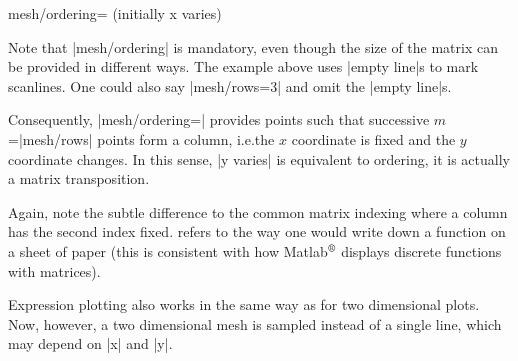 {\begin{pgfplotskey}{mesh/ordering= (initially x varies)}
\begin{codeexample}[]
\end{codeexample}
    \noindent Note that |mesh/ordering| is mandatory, even though the size of
    the matrix can be provided in different ways. The example above uses
    |empty line|s to mark scanlines. One could also say |mesh/rows=3| and omit
    the |empty line|s.

    Consequently, |mesh/ordering=| provides points such
    that successive $m$=|mesh/rows| points form a column, i.e.\@ the $x$
    coordinate is fixed and the $y$ coordinate changes. In this sense,
    |y varies| is equivalent to  ordering, it is actually
    a matrix transposition.
\begin{codeexample}[]
\end{codeexample}
    Again, note the subtle difference to the common matrix indexing where a
    column has the second index fixed. \PGFPlots{} refers to the way one would
    write down a function on a sheet of paper (this is consistent with how
    Matlab$^\text{\textregistered}$ displays discrete functions with matrices).
\end{pgfplotskey}

\begin{addplot3operation}[]{}{}
\label{cmd:addplot3:expr}
    Expression plotting also works in the same way as for two dimensional
    plots. Now, however, a two dimensional mesh is sampled instead of a single
    line, which may depend on |x| and |y|.


\end{addplot3operation}}
